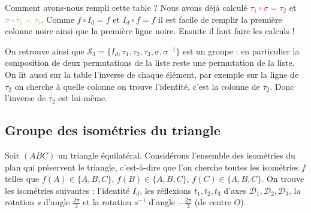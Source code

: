 \documentclass{book}
\begin{document}
Comment avons-nous rempli cette table ? Nous avons déjà calculé
\textcolor{red}{$\tau_1 \circ \sigma = \tau_2$} et
\textcolor{orange}{$\sigma \circ \tau_1=\tau_3$}.
Comme $f\circ I_d = f$ et $I_d \circ f = f$ il est facile de remplir la première colonne noire
ainsi que la première ligne noire. Ensuite il faut faire les calculs !

On retrouve ainsi que $\mathcal{S}_3 = \{I_d,\tau_1,\tau_2,\tau_3,\sigma,\sigma^{-1}\}$ est un groupe :
en particulier la composition de deux permutations de la liste reste une permutation de la liste.
On lit aussi sur la table l'inverse de chaque élément, par exemple sur la ligne de $\tau_2$
on cherche à quelle colonne on trouve l'identité, c'est la colonne de $\tau_2$. Donc l'inverse de $\tau_2$
est lui-même.


\subsection{Groupe des isométries du triangle}

Soit $(ABC)$ un triangle équilatéral.
Considérons l'ensemble des isométries du plan qui préservent le triangle, c'est-à-dire
que l'on cherche toutes les isométries $f$ telles que $f(A) \in \{A,B,C\}$,
$f(B) \in \{A,B,C\}$, $f(C) \in \{A,B,C\}$.
On trouve les isométries suivantes :
l'identité $I_d$, les réflexions $t_1, t_2, t_3$ d'axes $\mathcal{D}_1, \mathcal{D}_2,\mathcal{D}_3$,
la rotation $s$ d'angle $\frac{2\pi}{3}$ et la rotation $s^{-1}$ d'angle $-\frac{2\pi}{3}$
(de centre $O$).
\end{document}
